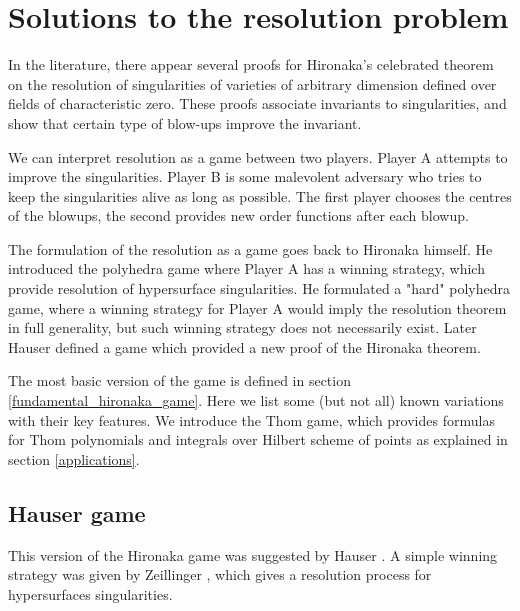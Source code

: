 \documentclass{article}
\theoremstyle{plain}
\theoremstyle{definition}
\theoremstyle{remark}
\begin{document}
\section{Solutions to the resolution problem}

In the literature, there appear several proofs for Hironaka's celebrated theorem on the resolution of singularities
of varieties of arbitrary dimension defined over fields of characteristic zero. These proofs associate invariants to 
singularities, and show that certain type of blow-ups improve the invariant. 

We can interpret resolution as a game between two players. Player A attempts to improve the singularities. 
Player B is some malevolent adversary who tries to keep the singularities alive as long as possible. 
The first player chooses the centres of the blowups, the second provides new order functions after each blowup. 

The formulation of the resolution as a game goes back to Hironaka himself. He introduced the polyhedra game where 
Player A has a winning strategy, which provide resolution of hypersurface singularities. He formulated a "hard" 
polyhedra game, where a winning strategy for Player A would imply the resolution theorem in full generality, but such 
winning strategy does not necessarily exist. 
Later Hauser defined a game which provided a new proof of the Hironaka theorem. 


The most basic version of the game is defined in section \ref{fundamental_hironaka_game}. Here we list some (but not all) known variations with their key features. We introduce the Thom game, which provides formulas for Thom polynomials and integrals over Hilbert scheme of points as explained in section \ref{applications}.

\subsection{Hauser game} 

This version of the Hironaka game was suggested by Hauser \cite{hauser1}. A simple winning strategy was given by Zeillinger \cite{zeillinger}, which gives a resolution process for hypersurfaces singularities. 
\end{document}
